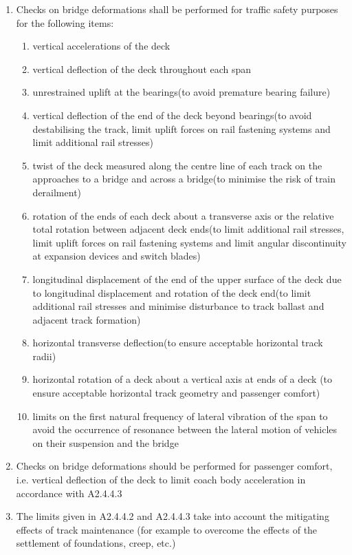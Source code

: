 \begin{enumerate}
	\item Checks on bridge deformations shall be performed for traffic safety purposes for the following items:
	\begin{enumerate}[-]
		\item vertical accelerations of the deck
		\item vertical deflection of the deck throughout each span
		\item unrestrained uplift at the bearings(to avoid premature bearing failure)
		\item vertical deflection of the end of the deck beyond bearings(to avoid destabilising the track, limit uplift forces on rail fastening systems and limit additional rail stresses) 
		\item twist of the deck measured along the centre line of each track on the approaches to a bridge and across a bridge(to minimise the risk of train derailment)
		\item rotation of the ends of each deck about a transverse axis or the relative total rotation between adjacent deck ends(to limit additional rail stresses, limit uplift forces on rail fastening systems and limit angular discontinuity at expansion devices and switch blades)
		\item longitudinal displacement of the end of the upper surface of the deck due to longitudinal displacement and rotation of the deck end(to limit additional rail stresses and minimise disturbance to track ballast and adjacent track formation)
		\item horizontal transverse deflection(to ensure acceptable horizontal track radii)
		\item horizontal rotation of a deck about a vertical axis at ends of a deck (to ensure acceptable horizontal track geometry and passenger comfort)
		\item limits on the first natural frequency of lateral vibration of the span to avoid the occurrence of resonance between the lateral motion of vehicles on their suspension and the bridge
	\end{enumerate}
	\item Checks on bridge deformations should be performed for passenger comfort, i.e. vertical deflection of the deck to limit coach body acceleration in accordance with A2.4.4.3\cite{EC0}
	\item The limits given in A2.4.4.2 and A2.4.4.3\cite{EC0} take into account the mitigating effects of track maintenance (for example to overcome the effects of the settlement of foundations, creep, etc.) 
\end{enumerate}

